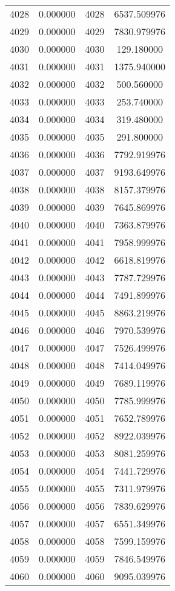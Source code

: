 \documentclass[12pt]{article}
\begin{document}
\begin{longtable}{@{}cccc@{}}
4028 & 0.000000 & 4028 & 6537.509976 \\
4029 & 0.000000 & 4029 & 7830.979976 \\
4030 & 0.000000 & 4030 & 129.180000 \\
4031 & 0.000000 & 4031 & 1375.940000 \\
4032 & 0.000000 & 4032 & 500.560000 \\
4033 & 0.000000 & 4033 & 253.740000 \\
4034 & 0.000000 & 4034 & 319.480000 \\
4035 & 0.000000 & 4035 & 291.800000 \\
4036 & 0.000000 & 4036 & 7792.919976 \\
4037 & 0.000000 & 4037 & 9193.649976 \\
4038 & 0.000000 & 4038 & 8157.379976 \\
4039 & 0.000000 & 4039 & 7645.869976 \\
4040 & 0.000000 & 4040 & 7363.879976 \\
4041 & 0.000000 & 4041 & 7958.999976 \\
4042 & 0.000000 & 4042 & 6618.819976 \\
4043 & 0.000000 & 4043 & 7787.729976 \\
4044 & 0.000000 & 4044 & 7491.899976 \\
4045 & 0.000000 & 4045 & 8863.219976 \\
4046 & 0.000000 & 4046 & 7970.539976 \\
4047 & 0.000000 & 4047 & 7526.499976 \\
4048 & 0.000000 & 4048 & 7414.049976 \\
4049 & 0.000000 & 4049 & 7689.119976 \\
4050 & 0.000000 & 4050 & 7785.999976 \\
4051 & 0.000000 & 4051 & 7652.789976 \\
4052 & 0.000000 & 4052 & 8922.039976 \\
4053 & 0.000000 & 4053 & 8081.259976 \\
4054 & 0.000000 & 4054 & 7441.729976 \\
4055 & 0.000000 & 4055 & 7311.979976 \\
4056 & 0.000000 & 4056 & 7839.629976 \\
4057 & 0.000000 & 4057 & 6551.349976 \\
4058 & 0.000000 & 4058 & 7599.159976 \\
4059 & 0.000000 & 4059 & 7846.549976 \\
4060 & 0.000000 & 4060 & 9095.039976 \\

\end{longtable}
\end{document}
